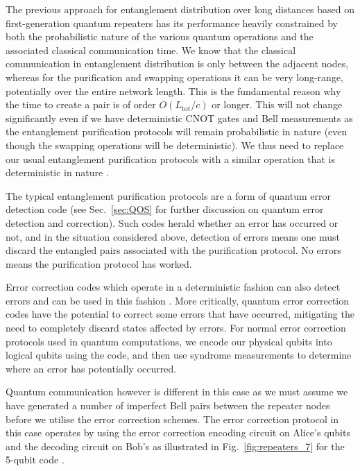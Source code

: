 The previous approach for entanglement distribution over long distances based on first-generation quantum repeaters has its performance heavily constrained by both the probabilistic nature of the various quantum operations and the associated classical communication time. We know that the classical communication in entanglement distribution is only between the adjacent nodes, whereas for the purification and swapping operations it can be very long-range, potentially over the entire network length. This is the fundamental reason why the time to create a pair is of order $O(L_\mathrm{tot}/c)$ or longer. This will not change significantly even if we have deterministic CNOT gates and Bell measurements as the entanglement purification protocols will remain probabilistic in nature (even though the swapping operations will be deterministic). We thus need to replace our usual entanglement purification protocols with a similar operation that is deterministic in nature \cite{bib:jiang09, bib:munro10}.

The typical entanglement purification protocols are a form of quantum error detection code \cite{bib:WJM2015, bib:devitt2013} (see Sec.~\ref{sec:QOS} for further discussion on quantum error detection and correction). Such codes herald whether an error has occurred or not, and in the situation considered above, detection of errors means one must discard the entangled pairs associated with the purification protocol. No errors means the purification protocol has worked.

Error correction codes which operate in a deterministic fashion can also detect errors and can be used in this fashion \cite{bib:jiang09, bib:munro10}. More critically, quantum error correction codes have the potential to correct some errors that have occurred, mitigating the need to completely discard states affected by errors. For normal error correction protocols used in quantum computations, we encode our physical qubits into logical qubits using the code, and then use syndrome measurements to determine where an error has potentially occurred.

Quantum communication however is different in this case as we must assume we have generated a number of imperfect Bell pairs between the repeater nodes before we utilise the error correction schemes. The error correction protocol in this case operates by using the error correction encoding circuit on Alice's qubits and the decoding circuit on Bob's \cite{bib:Aschauer2004} as illustrated in Fig.~\ref{fig:repeaters_7} for the 5-qubit code \cite{bib:Bennettr1996a, bib:Knill97}.

